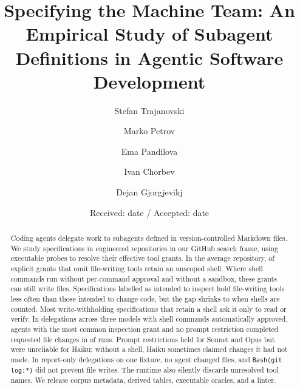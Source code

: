 \documentclass[smallextended,natbib]{svjour3}
\newcommand{\code}[1]{\texttt{\small #1}}
\begin{document}
\title{Specifying the Machine Team: An Empirical Study of Subagent Definitions in Agentic
Software Development}

\author{Stefan Trajanovski \and Marko Petrov \and Ema Pandilova \and Ivan Chorbev \and
Dejan Gjorgjevikj}


\date{Received: date / Accepted: date}

\maketitle

\begin{abstract}
Coding agents delegate work to subagents defined in version-controlled Markdown files. We study
\nSpecsEng{} specifications in \nReposEng{} engineered repositories in our GitHub search frame,
using executable probes to resolve their effective tool grants. In the average repository,
\RQthreeIncoherentEng{} of explicit grants that omit file-writing tools retain an unscoped shell.
Where shell commands run without per-command approval and without a sandbox, these grants can still write files.
Specifications labelled as intended to inspect hold file-writing tools \RQtwoRoleGapWrite{} less often
than those intended to change code, but the gap shrinks to \RQtwoRoleGapAuthority{} when shells are counted.
Most write-withholding specifications that retain a shell ask it only to read or verify. In
\nExpRuns{} delegations across three models with shell commands automatically approved, agents with
the most common inspection grant and no prompt restriction completed requested file changes in
\ExpCtwoRate{} of runs. Prompt restrictions held for Sonnet and Opus but were unreliable for Haiku;
without a shell, Haiku sometimes claimed changes it had not made. In \nOverRuns{} report-only
delegations on one fixture, no agent changed files, and \code{Bash(git log:*)} did not prevent file
writes. The runtime also silently discards unresolved tool names. We release corpus metadata,
derived tables, executable oracles, and a linter.
\end{abstract}
\end{document}
